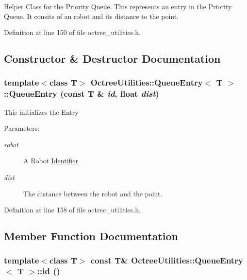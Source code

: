 Helper Class for the Priority Queue. This represents an entry in the Priority Queue. It consits of an robot and its distance to the point. 

Definition at line 150 of file octree\_\-utilities.h.

\subsection{Constructor \& Destructor Documentation}
\hypertarget{class_octree_utilities_1_1_queue_entry_4b3001a35f246edecbe10537592f2dd1}{
\subsubsection[QueueEntry]{\setlength{\rightskip}{0pt plus 5cm}template$<$class T$>$ {\bf OctreeUtilities::QueueEntry}$<$ T $>$::{\bf QueueEntry} (const T \& {\em id}, \/  float {\em dist})}}
\label{class_octree_utilities_1_1_queue_entry_4b3001a35f246edecbe10537592f2dd1}


This initializes the Entry \begin{Desc}
\item[Parameters:]
\begin{description}
\item[{\em robot}]A Robot \hyperlink{class_identifier}{Identifier} \item[{\em dist}]The distance between the robot and the point. \end{description}
\end{Desc}


Definition at line 158 of file octree\_\-utilities.h.

\subsection{Member Function Documentation}
\hypertarget{class_octree_utilities_1_1_queue_entry_352779fe64b13308ee400471ed9c1706}{
\subsubsection[id]{\setlength{\rightskip}{0pt plus 5cm}template$<$class T$>$ const T\& {\bf OctreeUtilities::QueueEntry}$<$ T $>$::id ()}}
\label{class_octree_utilities_1_1_queue_entry_352779fe64b13308ee400471ed9c1706}


